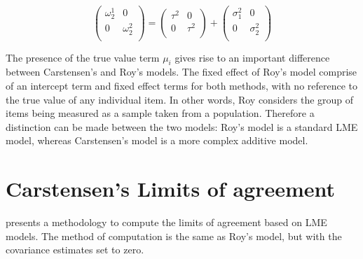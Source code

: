 \documentclass{report}
\begin{document}
\[\left(\begin{array}{cc}
\omega^1_2  & 0 \\
0 & \omega^2_2 \\
\end{array}  \right)
=  \left(
\begin{array}{cc}
\tau^2  & 0 \\
0 & \tau^2 \\
\end{array} \right)+
\left(
\begin{array}{cc}
\sigma^2_1  & 0 \\
0 & \sigma^2_2 \\
\end{array}\right)
\]


The presence of the true value term $\mu_i$ gives rise to an important difference between Carstensen's and Roy's models. The fixed effect of Roy's model comprise of an intercept term and fixed effect terms for both methods, with no reference to the true value of any individual item. In other words, Roy considers the group of items being measured as a sample taken from a population. Therefore a distinction can be made between the two models: Roy's model is a standard LME model, whereas Carstensen's model is a more complex additive model.




\section{Carstensen's Limits of agreement}
\citet{BXC2008} presents a methodology to compute the limits of agreement based on LME models. The method of computation is the
same as Roy's model, but with the covariance estimates set to zero.
\end{document}
